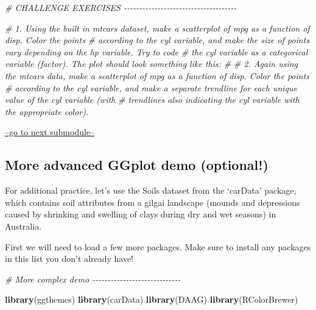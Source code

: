 \documentclass[
]{article}
\newenvironment{Shaded}{\begin{snugshade}}{\end{snugshade}}
\newcommand{\CommentTok}[1]{\textcolor[rgb]{0.56,0.35,0.01}{\textit{#1}}}
\newcommand{\FunctionTok}[1]{\textcolor[rgb]{0.13,0.29,0.53}{\textbf{#1}}}
\newcommand{\NormalTok}[1]{#1}
\begin{document}
\begin{Shaded}
\begin{Highlighting}[]
\CommentTok{\# CHALLENGE EXERCISES   {-}{-}{-}{-}{-}{-}{-}{-}{-}{-}{-}{-}{-}{-}{-}{-}{-}{-}{-}{-}{-}{-}{-}{-}{-}{-}{-}{-}{-}{-}{-}{-}{-}{-}{-}{-}{-}}

\CommentTok{\# 1. Using the built in \textquotesingle{}mtcars\textquotesingle{} dataset, make a scatterplot of \textquotesingle{}mpg\textquotesingle{} as a function of \textquotesingle{}disp\textquotesingle{}. Color the points}
\CommentTok{\# according to the \textquotesingle{}cyl\textquotesingle{} variable, and make the size of points vary depending on the \textquotesingle{}hp\textquotesingle{} variable. Try to code}
\CommentTok{\# the \textquotesingle{}cyl\textquotesingle{} variable as a categorical variable (factor). The plot should look something like this:}
\CommentTok{\#}
\CommentTok{\# 2. Again using the \textquotesingle{}mtcars\textquotesingle{} data, make a scatterplot of \textquotesingle{}mpg\textquotesingle{} as a function of \textquotesingle{}disp\textquotesingle{}. Color the points}
\CommentTok{\# according to the \textquotesingle{}cyl\textquotesingle{} variable, and make a separate trendline for each unique value of the \textquotesingle{}cyl\textquotesingle{} variable (with}
\CommentTok{\# trendlines also indicating the \textquotesingle{}cyl\textquotesingle{} variable with the appropriate color). }
\end{Highlighting}
\end{Shaded}

\href{module1_4.html}{--go to next submodule--}

\hypertarget{more-advanced-ggplot-demo-optional}{%
\subsection{More advanced GGplot demo
(optional!)}\label{more-advanced-ggplot-demo-optional}}

For additional practice, let's use the Soils dataset from the `carData'
package, which contains soil attributes from a gilgai landscape (mounds
and depressions caused by shrinking and swelling of clays during dry and
wet seasons) in Australia.

First we will need to load a few more packages. Make sure to install any
packages in this list you don't already have!

\begin{Shaded}
\begin{Highlighting}[]
\CommentTok{\# More complex demo {-}{-}{-}{-}{-}{-}{-}{-}{-}{-}{-}{-}{-}{-}{-}{-}{-}{-}{-}{-}{-}{-}{-}{-}{-}{-}{-}{-}{-}}

\FunctionTok{library}\NormalTok{(ggthemes)}
\FunctionTok{library}\NormalTok{(carData)}
\FunctionTok{library}\NormalTok{(DAAG)}
\FunctionTok{library}\NormalTok{(RColorBrewer)}
\end{Highlighting}
\end{Shaded}
\end{document}
